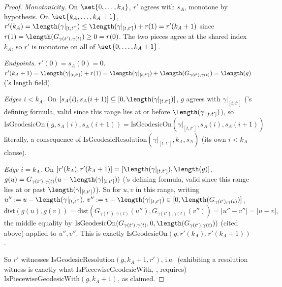 \begin{proof}
  \emph{Monotonicity.} On $\set{0,\dots,k_A}$, $r'$ agrees with $s_A$, monotone by hypothesis. On
  $\set{k_A,\dots,k_A+1}$, $r'(k_A)=\length(\gamma|_{[t,t']})\le\length(\gamma|_{[t,t']})+r(1)=r'(k_A+1)$
  since $r(1)=\length(G_{\gamma(t'),\gamma(t)})\ge0=r(0)$. The two pieces agree at the shared index
  $k_A$, so $r'$ is monotone on all of $\set{0,\dots,k_A+1}$.

  \emph{Endpoints.} $r'(0)=s_A(0)=0$. $r'(k_A+1) = \length(\gamma|_{[t,t']})+r(1) =
  \length(\gamma|_{[t,t']})+\length(G_{\gamma(t'),\gamma(t)}) = \length(g)$
  ('s length field).

  \emph{Edges $i<k_A$.} On $[s_A(i),s_A(i+1)] \subseteq [0,\length(\gamma|_{[t,t']})]$, $g$ agrees
  with $\gamma|_{[t,t']}$ ('s defining formula, valid since this range lies at
  or before $\length(\gamma|_{[t,t']})$), so $\mathrm{IsGeodesicOn}(g,s_A(i),s_A(i+1)) =
  \mathrm{IsGeodesicOn}(\gamma|_{[t,t']},s_A(i),s_A(i+1))$ literally, a consequence of
  $\mathrm{IsGeodesicResolution}(\gamma|_{[t,t']},k_A,s_A)$ (its own $i<k_A$ clause).

  \emph{Edge $i=k_A$.} On $[r'(k_A),r'(k_A+1)] = [\length(\gamma|_{[t,t']}),\length(g)]$, $g(u) =
  G_{\gamma(t'),\gamma(t)}(u-\length(\gamma|_{[t,t']}))$ ('s defining formula,
  valid since this range lies at or past $\length(\gamma|_{[t,t']})$). So for $u,v$ in this range,
  writing $u'':=u-\length(\gamma|_{[t,t']}),\,v'':=v-\length(\gamma|_{[t,t']}) \in
  [0,\length(G_{\gamma(t'),\gamma(t)})]$,
  \[
    \mathrm{dist}(g(u),g(v)) = \mathrm{dist}(G_{\gamma(t'),\gamma(t)}(u''),G_{\gamma(t'),\gamma(t)}(v''))
    = |u''-v''| = |u-v|
    ,
  \]
  the middle equality by $\mathrm{IsGeodesicOn}(G_{\gamma(t'),\gamma(t)},0,
  \length(G_{\gamma(t'),\gamma(t)}))$ (cited above) applied to $u'',v''$. This is exactly
  $\mathrm{IsGeodesicOn}(g,r'(k_A),r'(k_A+1))$.

  So $r'$ witnesses $\mathrm{IsGeodesicResolution}(g,k_A+1,r')$, i.e.\ (exhibiting a resolution
  witness is exactly what $\mathrm{IsPiecewiseGeodesicWith}$, ,
  requires) $\mathrm{IsPiecewiseGeodesicWith}(g,k_A+1)$, as claimed.
\end{proof}
